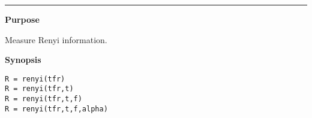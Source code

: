 

\hspace*{-1.6cm}{\Large \bf renyi}

\vspace*{-.4cm}
\hspace*{-1.6cm}\rule[0in]{16.5cm}{.02cm}
\vspace*{.2cm}



{\bf \large {}\selectfont Purpose}\\
\hspace*{1.5cm}
\begin{minipage}[t]{13.5cm}
Measure Renyi information.
\end{minipage}
\vspace*{.5cm}


{\bf \large {}\selectfont Synopsis}\\
\hspace*{1.5cm}
\begin{minipage}[t]{13.5cm}
\begin{verbatim}
R = renyi(tfr)
R = renyi(tfr,t)
R = renyi(tfr,t,f)
R = renyi(tfr,t,f,alpha)
\end{verbatim}
\end{minipage}
\vspace*{.5cm}


